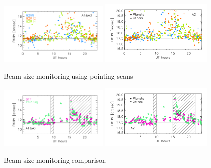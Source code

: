 \begin{figure}[ht!]
  \begin{center}
    \includegraphics[clip=true, trim={0.9cm, 0.5cm, 0.5cm, 0.5cm}, width=0.4725\textwidth]{Figures/Beams/Beam_monitoring_with_pointings_vs_ut_1mm.pdf}
    \includegraphics[clip=true, trim={0.5cm, 0.5cm, 0.5cm, 0.5cm}, width=0.4875\textwidth]{Figures/Beams/Beam_monitoring_with_pointings_vs_ut_a2.pdf}
    \caption[Beam size monitoring using pointing scans]{Beam size monitoring using pointing scans} 
\label{fig:beam_monitoring_pointing}
\end{center}
\end{figure}




\begin{figure}[ht!]
  \begin{center}
    \includegraphics[clip=true, trim={0.9cm, 0.5cm, 0.5cm, 0.5cm}, width=0.4725\textwidth]{Figures/Beams/Beam_monitoring_with_otfs_vs_ut_compare_pointings_1mm.pdf}
    \includegraphics[clip=true, trim={0.5cm, 0.5cm, 0.5cm, 0.5cm}, width=0.4875\textwidth]{Figures/Beams/Beam_monitoring_with_otfs_vs_ut_compare_pointings_a2.pdf}
    \caption[Beam size monitoring comparison]{Beam size monitoring comparison} 
\label{fig:beam_monitoring_compare}
\end{center}
\end{figure}





